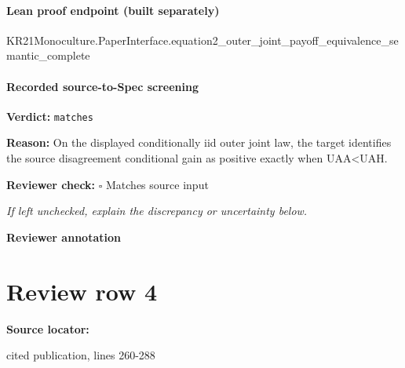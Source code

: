 \documentclass[10pt]{article}
\newcommand{\reviewerbox}{%
  \par\noindent\fbox{\parbox{0.96\linewidth}{\rule{0pt}{0.38in}}}\par
}
\newcommand{\reviewmatch}[1]{%
  \par\noindent\textbf{Reviewer check:} $\square$\; #1\par
  \noindent\emph{If left unchecked, explain the discrepancy or uncertainty below.}\par
}
\begin{document}
\paragraph{Lean proof endpoint (built separately)}\begin{ReviewVerbatim}
KR21Monoculture.PaperInterface.equation2_outer_joint_payoff_equivalence_semantic_complete
\end{ReviewVerbatim}

\paragraph{Recorded source-to-Spec screening}
\textbf{Verdict:} \texttt{matches}
\\
{\raggedright
\textbf{Reason:} On the displayed conditionally iid outer joint law, the target identifies the source disagreement conditional gain as positive exactly when UAA<UAH.\allowbreak{}
\par}
\reviewmatch{Matches source input}
\noindent\textbf{Reviewer annotation}\par
\reviewerbox
\clearpage
\hypertarget{source-claim-36b115610854f337}{}
\section*{Review row 4}
\textbf{Source locator:} {\footnotesize\raggedright cited publication, lines 260-\allowbreak{}288\par}
\end{document}
